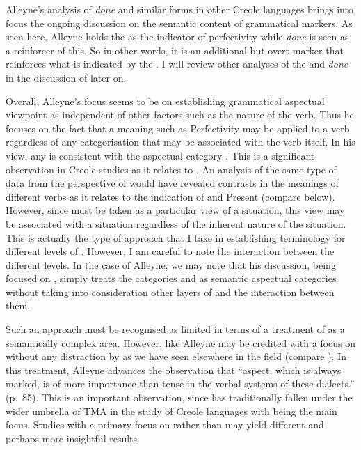 Alleyne’s analysis of \textit{done} and similar forms in other Creole
languages brings into focus the ongoing discussion on the semantic
content of grammatical markers.  As seen here, Alleyne holds the
 as the indicator of perfectivity while \textit{done} is
seen as a reinforcer of this.  So in other words, it is an additional but
overt marker that reinforces what is indicated by the .  I
will review other analyses of the  and \textit{done} in
the discussion of \citet{Youssef2003} later on.

Overall, Alleyne’s focus seems to be on establishing grammatical
aspectual viewpoint as independent of other factors such as the nature
of the verb. Thus he focuses on the fact that a meaning such as
Perfectivity may be applied to a verb regardless of any categorisation
that may be associated with the verb itself.  In his view, any
 is consistent with the aspectual category .
This is a significant observation in Creole studies as it relates to
.  An analysis of the same type of data from the perspective of
 would have revealed contrasts in the meanings of different verbs
as it relates to the indication of  and Present (compare
\citealt{Bickerton1975} below).  However, since  must be
taken as a particular view of a situation, this view may be associated
with a situation regardless of the inherent nature of the
situation. This is actually the type of approach that I take in
establishing terminology for different levels of .  However, I
am careful to note the interaction between the different levels.  In
the case of Alleyne, we may note that his discussion, being focused on
, simply treats the categories  and
 as semantic aspectual categories without taking into
consideration other layers of  and the interaction between them.

Such an approach must be recognised as limited in terms of a treatment
of  as a semantically complex area.  However, like
\citet{Voorhoeve1957} Alleyne may be credited with a focus on 
without any distraction by  as we have seen elsewhere in the
field (compare \citealt{Bickerton1975}).  In this treatment, Alleyne
advances the observation that ``aspect, which is always marked, is of
more importance than tense in the verbal systems of these dialects.”
(p.~85).  This is an important observation, since  has traditionally
fallen under the wider umbrella of TMA in the study of Creole
languages with  being the main focus.  Studies with a primary
focus on  rather than  may yield different and perhaps more
insightful results.

